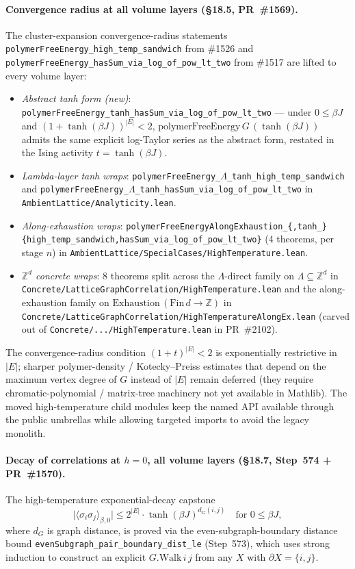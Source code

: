 \documentclass[a4paper,11pt]{article}
\newcommand{\LeanLambda}{\texorpdfstring{\ensuremath{\Lambda}}{Lambda}}
\begin{document}
\paragraph{Convergence radius at all volume layers (\S18.5,
PR~\#1569).} The cluster-expansion convergence-radius statements
\texttt{polymerFreeEnergy\_high\_temp\_sandwich} from \#1526 and
\texttt{polymerFreeEnergy\_hasSum\_via\_log\_of\_pow\_lt\_two} from \#1517 are
lifted to every volume layer:
\begin{itemize}
  \item \emph{Abstract tanh form (new)}:
    \texttt{polymerFreeEnergy\_tanh\_hasSum\_via\_log\_of\_pow\_lt\_two}
    --- under $0 \le \beta J$ and $(1+\tanh(\beta J))^{|E|} < 2$,
    $\mathrm{polymerFreeEnergy}\,G\,(\tanh(\beta J))$ admits the same
    explicit log-Taylor series as the abstract form, restated in the
    Ising activity $t = \tanh(\beta J)$.
  \item \emph{Lambda-layer tanh wraps}:
    \texttt{polymerFreeEnergy\_\LeanLambda\_tanh\_high\_temp\_sandwich} and
    \texttt{polymerFreeEnergy\_\LeanLambda\_tanh\_hasSum\_via\_log\_of\_pow\_lt\_two}
    in \texttt{AmbientLattice/Analyticity.lean}.
  \item \emph{Along-exhaustion wraps}:
    \texttt{polymerFreeEnergyAlongExhaustion\_\{,tanh\_\}\{high\_temp\_sandwich,hasSum\_via\_log\_of\_pow\_lt\_two\}}
    (4 theorems, per stage $n$) in
    \texttt{AmbientLattice/SpecialCases/HighTemperature.lean}.
  \item \emph{$\mathbb{Z}^d$ concrete wraps}: 8 theorems split across
    the $\Lambda$-direct family on $\Lambda \subseteq \mathbb{Z}^d$
    in
    \texttt{Concrete/LatticeGraphCorrelation/HighTemperature.lean} and
    the along-exhaustion family on
    $\mathrm{Exhaustion}\,(\mathrm{Fin}\,d \to \mathbb{Z})$ in
    \texttt{Concrete/LatticeGraphCorrelation/HighTemperatureAlongEx.lean}
    (carved out of \texttt{Concrete/.../HighTemperature.lean} in PR~\#2102).
\end{itemize}
The convergence-radius condition $(1+t)^{|E|} < 2$ is exponentially
restrictive in $|E|$; sharper polymer-density / Kotecky--Preiss
estimates that depend on the maximum vertex degree of $G$ instead of
$|E|$ remain deferred (they require chromatic-polynomial /
matrix-tree machinery not yet available in Mathlib). The moved
high-temperature child modules keep the named API available through the
public umbrellas while allowing targeted imports to avoid the legacy
monolith.

\paragraph{Decay of correlations at $h=0$, all volume layers
(\S18.7, Step~574 + PR~\#1570).} The
high-temperature exponential-decay capstone
\[
\bigl|\langle \sigma_i \sigma_j \rangle_{\beta,0}\bigr|
  \le 2^{|E|} \cdot \tanh(\beta J)^{d_G(i,j)}
\quad \text{for } 0 \le \beta J,
\]
where $d_G$ is graph distance, is proved via the
even-subgraph-boundary distance bound
\texttt{evenSubgraph\_pair\_boundary\_dist\_le} (Step~573), which
uses strong induction to construct an explicit
$G.\mathrm{Walk}\,i\,j$ from any $X$ with
$\partial X = \{i, j\}$.
\end{document}
